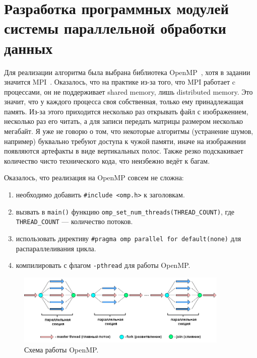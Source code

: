 \section{Разработка программных модулей системы параллельной обработки данных}
Для реализации алгоритма была выбрана библиотека OpenMP~\cite{OpenMPManual}, хотя в задании значится MPI~\cite{MPIManual}.%
Оказалось, что на практике из-за того, что MPI работает c процессами, он не поддерживает shared memory, лишь distributed memory.
Это значит, что у каждого процесса своя собственная, только ему принадлежащая память.
Из-за этого приходится несколько раз открывать файл с изображением, несколько раз его читать, а для записи передать матрицы размером несколько мегабайт.
Я уже не говорю о том, что некоторые алгоритмы (устранение шумов, например) буквально требуют доступа к чужой памяти, иначе на изображении появляются артефакты в виде вертикальных полос.
Также резко подскакивает количество чисто технического кода, что неизбежно ведёт к багам.

Оказалось, что реализация на OpenMP совсем не сложна:
\begin{enumerate}
    \item необходимо добавить \texttt{\#include <omp.h>} к заголовкам.
    \item вызвать в \texttt{main()} функцию \texttt{omp\_set\_num\_threads(THREAD\_COUNT)}, где \texttt{THREAD\_COUNT} --- количество потоков.
    \item использовать директиву \texttt{\#pragma omp parallel for default(none)} для распараллеливания цикла.
    \item компилировать с флагом \texttt{-pthread} для работы OpenMP.%
\end{enumerate}%

\begin{figure}[h]
    \begin{center}
        \includegraphics[width=0.9\textwidth]{../resources/openMP}
    \end{center}
    \caption{Схема работы OpenMP.}
\end{figure}
